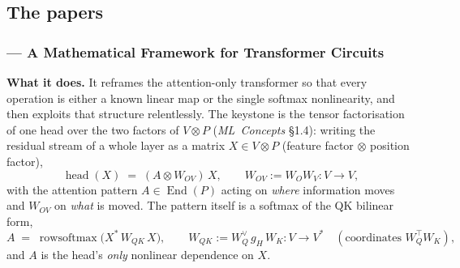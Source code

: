 \subsection*{The papers}

\subsubsection*{\textcite{framework} --- A Mathematical Framework for Transformer Circuits}

\textbf{What it does.} It reframes the attention-only transformer so that every operation is either a known linear map or the single softmax nonlinearity, and then exploits that structure relentlessly. The keystone is the tensor factorisation of one head over the two factors of $V\otimes P$ (\emph{ML~Concepts} \S1.4): writing the residual stream of a whole layer as a matrix $X\in V\otimes P$ (feature factor $\otimes$ position factor),
\[
\operatorname{head}(X) \;=\; (A \otimes W_{OV})\,X, \qquad W_{OV} := W_O W_V : V\to V,
\]
with the attention pattern $A\in\operatorname{End}(P)$ acting on \emph{where} information moves and $W_{OV}$ on \emph{what} is moved. The pattern itself is a softmax of the QK bilinear form,
\[
A \;=\; \operatorname{rowsoftmax}\!\big(X^{*}\,W_{QK}\,X\big), \qquad W_{QK} := W_Q^{\vee}\,g_H\,W_K : V\to V^{*} \quad(\text{coordinates } W_Q^{\top}W_K),
\]
and $A$ is the head's \emph{only} nonlinear dependence on $X$.

